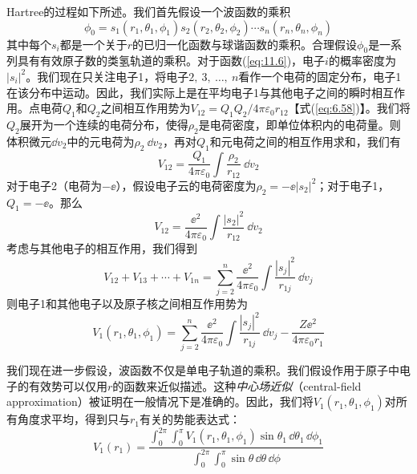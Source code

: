     Hartree的过程如下所述。我们首先假设一个波函数的乘积
    \begin{equation}
        \phi_0 = s_1(r_1, \theta_1, \phi_1) s_2(r_2, \theta_2, \phi_2) \cdots s_n(r_n, \theta_n, \phi_n)
        \label{eq:11.6}
    \end{equation}
    其中每个$s_i$都是一个关于$r$的已归一化函数与球谐函数的乘积。合理假设$\phi_0$是一系列具有有效原子数的类氢轨道的乘积。对于函数(\ref{eq:11.6})，电子$i$的概率密度为$\left|s_i\right|^2$。我们现在只关注电子1，将电子$2,\:3,\:\ldots,\:n$看作一个电荷的固定分布，电子1在该分布中运动。因此，我们实际上是在平均电子1与其他电子之间的瞬时相互作用。点电荷$Q_1$和$Q_2$之间相互作用势为$V_{12} = Q_1 Q_2 / 4\pi\varepsilon_0 r_{12}$【式(\ref{eq:6.58})】。我们将$Q_2$展开为一个连续的电荷分布，使得$\rho_2$是电荷密度，即单位体积内的电荷量。则体积微元$\dd v_2$中的元电荷为$\rho_2 \:\dd v_2$，再对$Q_1$和元电荷之间的相互作用求和，我们有
    \begin{equation*}
        V_{12} = \frac{Q_1}{4\pi\varepsilon_0} \int \frac{\rho_2}{r_{12}} \:\dd v_2
    \end{equation*}
    对于电子2（电荷为$-\ee $），假设电子云的电荷密度为$\rho_2 = -\ee \left|s_2\right|^2$；对于电子1，$Q_1 = -\ee $。那么
    \begin{equation*}
        V_{12} = \frac{\ee ^2}{4\pi\varepsilon_0} \int \frac{\left|s_2\right|^2}{r_{12}} \:\dd v_2
    \end{equation*}
    考虑与其他电子的相互作用，我们得到
    \begin{equation*}
        V_{12} + V_{13} + \cdots + V_{1n} = \sum_{j=2}^{n} \frac{\ee ^2}{4\pi\varepsilon_0} \int \frac{\left|s_j\right|^2}{r_{1j}} \:\dd v_j
    \end{equation*}
    则电子1和其他电子以及原子核之间相互作用势为
    \begin{equation}
        V_1(r_1, \theta_1, \phi_1) = \sum_{j=2}^{n} \frac{\ee ^2}{4\pi\varepsilon_0} \int \frac{|s_j|^2}{r_{1j}} \:\dd v_j - \frac{Z\ee ^2}{4\pi\varepsilon_0 r_1}
        \label{eq:11.7}
    \end{equation}

    我们现在进一步假设，波函数不仅是单电子轨道的乘积。我们假设作用于原子中电子的有效势可以仅用$r$的函数来近似描述。这种\textit{中心场近似}（central-field approximation）被证明在一般情况下是准确的。因此，我们将$V_1(r_1, \theta_1, \phi_1)$对所有角度求平均，得到只与$r_1$有关的势能表达式：
    \begin{equation}
        V_{1}(r_{1}) =
        \dfrac{
            \displaystyle \int_{0}^{2\pi} \int_{0}^{\pi} V_{1}(r_{1}, \theta_{1}, \phi_{1}) \sin \theta_{1} \, \dd \theta_{1} \, \dd \phi_{1}
        }{
            \displaystyle \int_{0}^{2\pi} \int_{0}^{\pi} \sin \theta \, \dd \theta \, \dd \phi
        }
        \label{eq:11.8}
    \end{equation}

